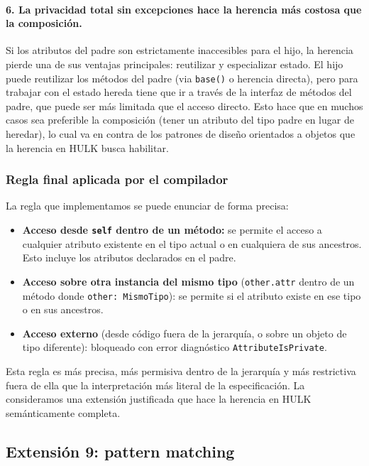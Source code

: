 \documentclass[12pt,letterpaper]{article}
\newcommand{\hulk}{\textsc{HULK}}
\newcommand{\src}[1]{\texttt{#1}}
\begin{document}
\paragraph{6. La privacidad total sin excepciones hace la herencia más costosa que la composición.}

Si los atributos del padre son estrictamente inaccesibles para el hijo, la herencia pierde una de sus ventajas principales: reutilizar y especializar estado. El hijo puede reutilizar los métodos del padre (via \src{base()} o herencia directa), pero para trabajar con el estado hereda tiene que ir a través de la interfaz de métodos del padre, que puede ser más limitada que el acceso directo. Esto hace que en muchos casos sea preferible la composición (tener un atributo del tipo padre en lugar de heredar), lo cual va en contra de los patrones de diseño orientados a objetos que la herencia en \hulk{} busca habilitar.

\subsubsection{Regla final aplicada por el compilador}

La regla que implementamos se puede enunciar de forma precisa:

\begin{itemize}
    \item \textbf{Acceso desde \src{self} dentro de un método:} se permite el acceso a cualquier atributo existente en el tipo actual o en cualquiera de sus ancestros. Esto incluye los atributos declarados en el padre.
    \item \textbf{Acceso sobre otra instancia del mismo tipo} (\src{other.attr} dentro de un método donde \src{other: MismoTipo}): se permite si el atributo existe en ese tipo o en sus ancestros.
    \item \textbf{Acceso externo} (desde código fuera de la jerarquía, o sobre un objeto de tipo diferente): bloqueado con error diagnóstico \src{AttributeIsPrivate}.
\end{itemize}

Esta regla es más precisa, más permisiva dentro de la jerarquía y más restrictiva fuera de ella que la interpretación más literal de la especificación. La consideramos una extensión justificada que hace la herencia en \hulk{} semánticamente completa.

\subsection{Extensión 9: pattern matching}
\end{document}
